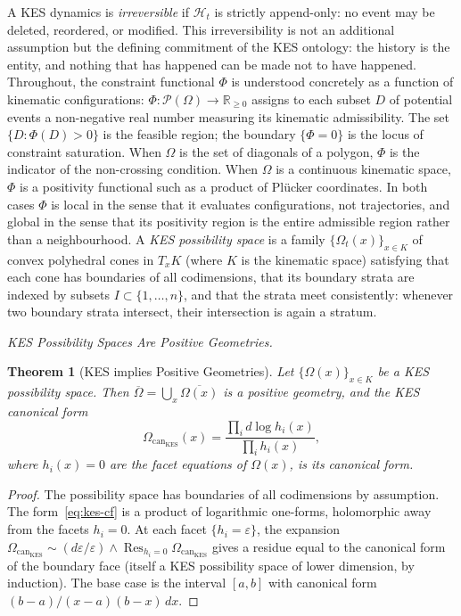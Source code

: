 \documentclass[12pt, oneside]{amsart}
\theoremstyle{plain}
\newtheorem{theorem}{Theorem}[section]
\theoremstyle{definition}
\theoremstyle{remark}
\DeclareMathOperator{\Res}{Res}
\newcommand{\R}{\mathbb{R}}
\newcommand{\eps}{\varepsilon}
\newcommand{\Phif}{\Phi}
\newcommand{\OmKS}{\Omega}
\newcommand{\HKS}{\mathcal{H}}
\newcommand{\CF}{\Omega_{\mathrm{can}}}
\begin{document}
A KES dynamics is \emph{irreversible} if $\HKS_t$ is strictly append-only: no event may be deleted, reordered, or modified. This irreversibility is not an additional assumption but the defining commitment of the KES ontology: the history is the entity, and nothing that has happened can be made not to have happened. Throughout, the constraint functional $\Phif$ is understood concretely as a function of kinematic configurations: $\Phif: \mathcal{P}(\OmKS) \to \R_{\geq 0}$ assigns to each subset $D$ of potential events a non-negative real number measuring its kinematic admissibility. The set $\{D : \Phif(D) > 0\}$ is the feasible region; the boundary $\{\Phif = 0\}$ is the locus of constraint saturation. When $\OmKS$ is the set of diagonals of a polygon, $\Phif$ is the indicator of the non-crossing condition. When $\OmKS$ is a continuous kinematic space, $\Phif$ is a positivity functional such as a product of Pl\"{u}cker coordinates. In both cases $\Phif$ is local in the sense that it evaluates configurations, not trajectories, and global in the sense that its positivity region is the entire admissible region rather than a neighbourhood. A \emph{KES possibility space} is a family $\{\OmKS_t(x)\}_{x \in K}$ of convex polyhedral cones in $T_x K$ (where $K$ is the kinematic space) satisfying that each cone has boundaries of all codimensions, that its boundary strata are indexed by subsets $I \subset \{1,\ldots,n\}$, and that the strata meet consistently: whenever two boundary strata intersect, their intersection is again a stratum.

\medskip\noindent\textit{KES Possibility Spaces Are Positive Geometries.}

\begin{theorem}[KES implies Positive Geometries]
\label{thm:kes-pg}
Let $\{\OmKS(x)\}_{x \in K}$ be a KES possibility space. Then $\overline{\OmKS} = \bigcup_{x} \overline{\OmKS(x)}$ is a positive geometry, and the KES canonical form
\begin{equation}
\label{eq:kes-cf}
  \CF_{\mathrm{KES}}(x) = \frac{\prod_i d\log h_i(x)}{\prod_i h_i(x)},
\end{equation}
where $h_i(x) = 0$ are the facet equations of $\OmKS(x)$, is its canonical form.
\end{theorem}

\begin{proof}
The possibility space has boundaries of all codimensions by assumption. The form~\eqref{eq:kes-cf} is a product of logarithmic one-forms, holomorphic away from the facets $h_i = 0$. At each facet $\{h_i = \eps\}$, the expansion $\CF_{\mathrm{KES}} \sim (d\eps/\eps) \wedge \Res_{h_i = 0}\CF_{\mathrm{KES}}$ gives a residue equal to the canonical form of the boundary face (itself a KES possibility space of lower dimension, by induction). The base case is the interval $[a,b]$ with canonical form $(b-a)/(x-a)(b-x) \, dx$.
\end{proof}
\end{document}

